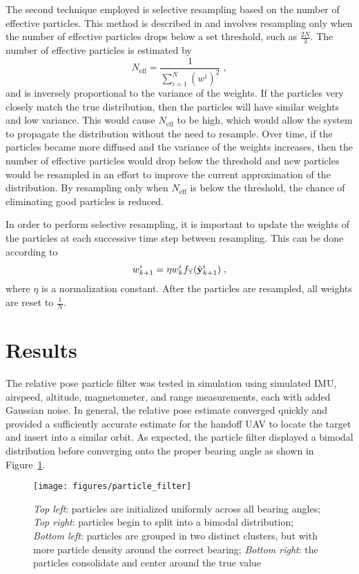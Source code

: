 The second technique employed is selective resampling based on the number of effective particles.
This method is described in \cite{GrisettiStachnissBurgard09} and involves resampling only when the number of effective particles drops below a set threshold, such as $\frac{2N}{3}$.
The number of effective particles is estimated by
\begin{equation}
    N_\text{eff}={\frac{1}{\sum\limits_{i=1}^{N} {(w^{i})}^{2}}}\;,
\end{equation}
and is inversely proportional to the variance of the weights.
If the particles very closely match the true distribution, then the particles will have similar weights and low variance.
This would cause $N_\text{eff}$ to be high, which would allow the system to propagate the distribution without the need to resample.
Over time, if the particles became more diffused and the variance of the weights increases, then the number of effective particles would drop below the threshold and new particles would be resampled in an effort to improve the current approximation of the distribution.
By resampling only when $N_\text{eff}$ is below the threshold, the chance of eliminating good particles is reduced.

In order to perform selective resampling, it is important to update the weights of the particles at each successive time step between resampling.
This can be done according to
\begin{equation}
    w^i_{k+1} = \eta w^i_k f_\mathbb{Y}(\y[\hat]^i_{k+1})\;,
\end{equation}
where $\eta$ is a normalization constant.
After the particles are resampled, all weights are reset to $\frac{1}{N}$.

\section{Results} \label{sec:rel_pose_results}
The relative pose particle filter was tested in simulation using simulated IMU, airspeed, altitude, magnetometer, and range measurements, each with added Gaussian noise.
In general, the relative pose estimate converged quickly and provided a sufficiently accurate estimate for the handoff UAV to locate the target and insert into a similar orbit.
As expected, the particle filter displayed a bimodal distribution before converging onto the proper bearing angle as shown in Figure~\ref{fig:particle_filter}.

\begin{figure}[hbt]
  \centering
  \texttt{[image: figures/particle\_filter]}
  \caption{\textit{Top left}: particles are initialized uniformly across all bearing angles; \textit{Top right}: particles begin to split into a bimodal distribution; \textit{Bottom left}: particles are grouped in two distinct clusters, but with more particle density around the correct bearing; \textit{Bottom right}: the particles consolidate and center around the true value}
  \label{fig:particle_filter}
\end{figure}

